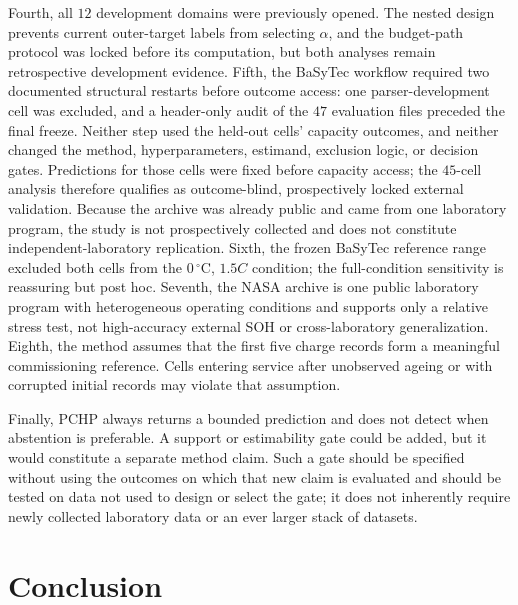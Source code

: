 \documentclass[11pt]{article}
\begin{document}
Fourth, all $12$ development domains were previously opened. The nested design prevents current outer-target labels from selecting $\alpha$, and the budget-path protocol was locked before its computation, but both analyses remain retrospective development evidence. Fifth, the BaSyTec workflow required two documented structural restarts before outcome access: one parser-development cell was excluded, and a header-only audit of the $47$ evaluation files preceded the final freeze. Neither step used the held-out cells' capacity outcomes, and neither changed the method, hyperparameters, estimand, exclusion logic, or decision gates. Predictions for those cells were fixed before capacity access; the $45$-cell analysis therefore qualifies as outcome-blind, prospectively locked external validation. Because the archive was already public and came from one laboratory program, the study is not prospectively collected and does not constitute independent-laboratory replication. Sixth, the frozen BaSyTec reference range excluded both cells from the $0\,^{\circ}\mathrm{C}$, $1.5C$ condition; the full-condition sensitivity is reassuring but post hoc. Seventh, the NASA archive is one public laboratory program with heterogeneous operating conditions and supports only a relative stress test, not high-accuracy external SOH or cross-laboratory generalization. Eighth, the method assumes that the first five charge records form a meaningful commissioning reference. Cells entering service after unobserved ageing or with corrupted initial records may violate that assumption.

Finally, PCHP always returns a bounded prediction and does not detect when abstention is preferable. A support or estimability gate could be added, but it would constitute a separate method claim. Such a gate should be specified without using the outcomes on which that new claim is evaluated and should be tested on data not used to design or select the gate; it does not inherently require newly collected laboratory data or an ever larger stack of datasets.

\section{Conclusion}
\end{document}
